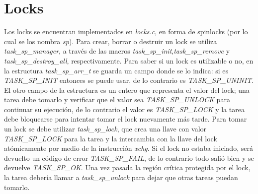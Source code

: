 \documentclass[a4paper]{article}
\begin{document}
\section{Locks}
Los locks se encuentran implementados en \textit{locks.c}, en forma
de spinlocks (por lo cual se los nombra \textit{sp}). Para crear,
borrar o destruir un lock se utiliza \textit{task\_sp\_manager}, a
través de las macros \textit{task\_sp\_init},\textit{task\_sp\_remove}
y \textit{task\_sp\_destroy\_all}, respectivamente. Para saber si un
lock es utilizable o no, en la estructura \textit{task\_sp\_arr\_t}
se guarda un campo donde se lo indica: si es
\textit{TASK\_SP\_INIT} entonces se puede usar, de lo contrario es
\textit{TASK\_SP\_UNINIT}. El otro campo de la estructura es un
entero que representa el valor del lock; una tarea debe tomarlo y
verificar que el valor sea \textit{TASK\_SP\_UNLOCK} para continuar
su ejecución, de lo contrario el valor es \textit{TASK\_SP\_LOCK}
y la tarea debe bloquearse para intentar tomar el lock nuevamente más
tarde. Para tomar un lock se debe utilizar \textit{task\_sp\_lock},
que crea una llave con valor \textit{TASK\_SP\_LOCK} para la tarea y
la intercambia con la llave del lock atómicamente por medio de la
instrucción \textit{xchg}. Si el lock no estaba iniciado, será
devuelto un código de error \textit{TASK\_SP\_FAIL}, de lo contrario
todo salió bien y se devuelve \textit{TASK\_SP\_OK}. Una vez pasada
la región crítica protegida por el lock, la tarea debería llamar a
\textit{task\_sp\_unlock} para dejar que otras tareas puedan tomarlo.
\end{document}
